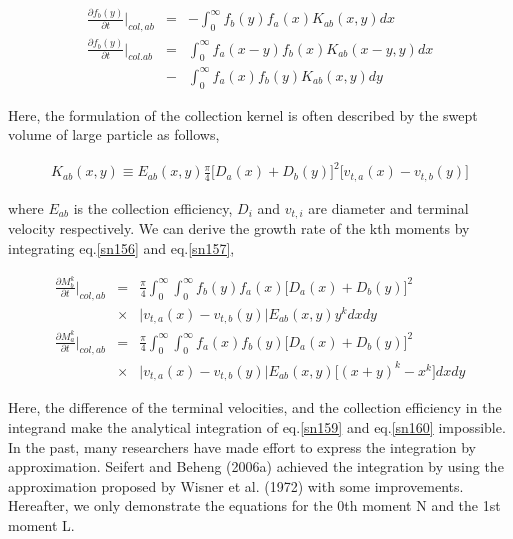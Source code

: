 \begin{eqnarray}
\frac{\partial f_{b}(y)}{\partial t}\Bigr|_{col,ab}&=&-\int_{0}^{\infty}f_{b}(y)f_{a}(x)K_{ab}(x,y)dx\label{sn156}\\
\frac{\partial f_{b}(y)}{\partial t}\Bigr|_{col.ab}&=&\int_{0}^{\infty}f_{a}(x-y)f_{b}(x)K_{ab}(x-y,y)dx\nonumber\\
&-&\int_{0}^{\infty}f_{a}(x)f_{b}(y)K_{ab}(x,y)dy\label{sn157}
\end{eqnarray}

Here, the formulation of the collection kernel is often described by the swept volume of large particle as follows,

\begin{eqnarray}
K_{ab}(x,y)\equiv E_{ab}(x,y)\frac{\pi}{4}\bigl[D_{a}(x)+D_{b}(y)\bigr]^{2}\bigl[v_{t,a}(x)-v_{t,b}(y)\bigr]\label{sn158}
\end{eqnarray}

where $E_{ab}$ is the collection efficiency, $D_{i}$ and $v_{t,i}$ are diameter and terminal velocity respectively. We can derive the growth rate of the kth moments by integrating eq.\ref{sn156} and eq.\ref{sn157},

\begin{eqnarray}
\frac{\partial M_{b}^{k}}{\partial t}\Bigr|_{col,ab}&=&\frac{\pi}{4}\int_{0}^{\infty}\int_{0}^{\infty}f_{b}(y)f_{a}(x)\bigl[D_{a}(x)+D_{b}(y)\bigr]^{2}\nonumber\\
&\times&\bigl|v_{t,a}(x)-v_{t,b}(y)\bigr|E_{ab}(x,y)y^{k}dxdy\label{sn159}\\
\frac{\partial M_{a}^{k}}{\partial t}\Bigr|_{col,ab}&=&\frac{\pi}{4}\int_{0}^{\infty}\int_{0}^{\infty}f_{a}(x)f_{b}(y)\bigl[D_{a}(x)+D_{b}(y)\bigr]^{2}\nonumber\\
&\times&\bigl|v_{t,a}(x)-v_{t,b}(y)\bigr|E_{ab}(x,y)\bigl[(x+y)^{k}-x^{k}\bigr]dxdy\label{sn160}
\end{eqnarray}

Here, the difference of the terminal velocities, and the collection efficiency in the integrand make the analytical integration of eq.\ref{sn159} and eq.\ref{sn160} impossible. In the past, many researchers have made effort to express the integration by approximation. Seifert and Beheng (2006a) achieved the integration by using the approximation proposed by Wisner et al. (1972) with some improvements. Hereafter, we only demonstrate the equations for the 0th moment N and the 1st moment L.

